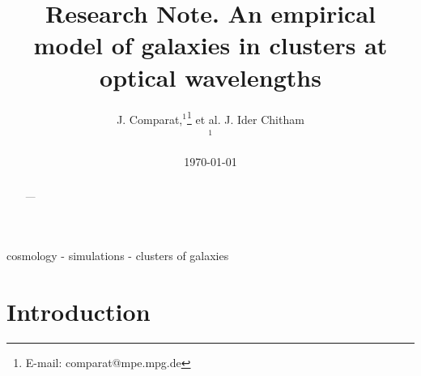 \documentclass[fleqn,usenatbib,onecolumn]{mnras}
\title[Optical cluster galaxy mock]{Research Note. An empirical model of galaxies in clusters at optical wavelengths}
\author[J. Comparat et al.]{
J. Comparat,$^{1}$\thanks{E-mail: comparat@mpe.mpg.de} et al. 
J. Ider Chitham \newauthor 
\\
$^{1}$ 	 \\
}
\date{\today}
\begin{document}
\label{firstpage}
\pagerange{\pageref{firstpage}--\pageref{lastpage}}
\maketitle
\begin{abstract}
---
\end{abstract}

\begin{keywords}
cosmology - simulations - clusters of galaxies 
\end{keywords}


\section{Introduction}


\end{document}
